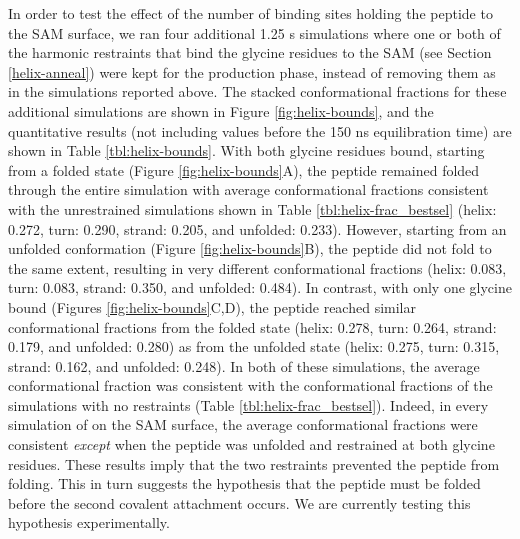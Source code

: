 In order to test the effect of the number of binding sites holding the peptide to the SAM surface, we ran four additional 1.25 \textmu{}s simulations where one or both of the harmonic restraints that bind the glycine residues to the SAM (see Section \ref{helix-anneal}) were kept for the production phase, instead of removing them as in the simulations reported above. 
The stacked conformational fractions for these additional simulations are shown in Figure \ref{fig:helix-bounds}, and the quantitative results (not including values before the 150 ns equilibration time) are shown in Table \ref{tbl:helix-bounds}. 
With both glycine residues bound, starting from a folded state (Figure \ref{fig:helix-bounds}A), the peptide remained folded through the entire simulation with average conformational fractions consistent with the unrestrained simulations shown in Table \ref{tbl:helix-frac_bestsel} (helix: 0.272, turn: 0.290, strand: 0.205, and unfolded: 0.233). 
However, starting from an unfolded conformation (Figure \ref{fig:helix-bounds}B), the peptide did not fold to the same extent, resulting in very different conformational fractions (helix: 0.083, turn: 0.083, strand: 0.350, and unfolded: 0.484). 
In contrast, with only one glycine bound (Figures \ref{fig:helix-bounds}C,D), the peptide reached similar conformational fractions from the folded state (helix: 0.278, turn: 0.264, strand: 0.179, and unfolded: 0.280) as from the unfolded state (helix: 0.275, turn: 0.315, strand: 0.162, and unfolded: 0.248). 
In both of these simulations, the average conformational fraction was consistent with the conformational fractions of the simulations with no restraints (Table \ref{tbl:helix-frac_bestsel}). 
Indeed, in every simulation of \pep{} on the SAM surface, the average conformational fractions were consistent \emph{except} when the peptide was unfolded and restrained at both glycine residues. 
These results imply that the two restraints prevented the peptide from folding. 
This in turn suggests the hypothesis that the peptide must be folded before the second covalent attachment occurs. 
We are currently testing this hypothesis experimentally. 

